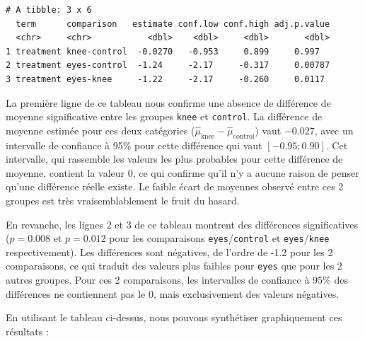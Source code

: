 \documentclass[a4paperpaper,]{article}
\newenvironment{Shaded}{\begin{snugshade}}{\end{snugshade}}
\newcommand{\DataTypeTok}[1]{\textcolor[rgb]{0.00,0.34,0.68}{#1}}
\newcommand{\DecValTok}[1]{\textcolor[rgb]{0.69,0.50,0.00}{#1}}
\newcommand{\KeywordTok}[1]{\textcolor[rgb]{0.12,0.11,0.11}{\textbf{#1}}}
\newcommand{\NormalTok}[1]{\textcolor[rgb]{0.12,0.11,0.11}{#1}}
\newcommand{\OperatorTok}[1]{\textcolor[rgb]{0.12,0.11,0.11}{#1}}
\newcommand{\StringTok}[1]{\textcolor[rgb]{0.75,0.01,0.01}{#1}}
\begin{document}
\begin{verbatim}
# A tibble: 3 x 6
  term      comparison   estimate conf.low conf.high adj.p.value
  <chr>     <chr>           <dbl>    <dbl>     <dbl>       <dbl>
1 treatment knee-control  -0.0270   -0.953     0.899     0.997  
2 treatment eyes-control  -1.24     -2.17     -0.317     0.00787
3 treatment eyes-knee     -1.22     -2.17     -0.260     0.0117 
\end{verbatim}

La première ligne de ce tableau nous confirme une absence de différence de moyenne significative entre les groupes \texttt{knee} et \texttt{control}. La différence de moyenne estimée pour ces deux catégories (\(\hat{\mu}_{\textrm{knee}} - \hat{\mu}_{\textrm{control}}\)) vaut \(-0.027\), avec un intervalle de confiance à 95\% pour cette différence qui vaut \([-0.95 ; 0.90]\). Cet intervalle, qui rassemble les valeurs les plus probables pour cette différence de moyenne, contient la valeur 0, ce qui confirme qu'il n'y a aucune raison de penser qu'une différence réelle existe. Le faible écart de moyennes observé entre ces 2 groupes est très vraisemblablement le fruit du hasard.

En revanche, les lignes 2 et 3 de ce tableau montrent des différences significatives (\(p = 0.008\) et \(p = 0.012\) pour les comparaisons \texttt{eyes}/\texttt{control} et \texttt{eyes}/\texttt{knee} respectivement). Les différences sont négatives, de l'ordre de -1.2 pour les 2 comparaisons, ce qui traduit des valeurs plus faibles pour \texttt{eyes} que pour les 2 autres groupes. Pour ces 2 comparaisons, les intervalles de confiance à 95\% des différences ne contiennent pas le 0, mais exclusivement des valeurs négatives.

En utilisant le tableau ci-dessus, nous pouvons synthétiser graphiquement ces résultats :

\begin{Shaded}
\end{Shaded}
\end{document}
